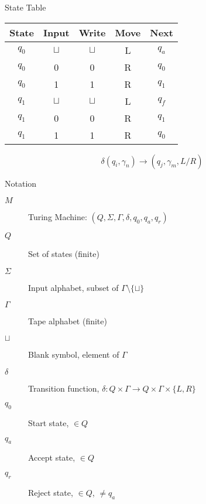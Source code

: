 \begin{frame}{State Table}
  \begin{table}
    \centering
    \begin{tabular}{cc|ccc}
    \toprule
        State & Input & Write & Move & Next \\
    \midrule
        $q_0$ & $\sqcup$ & $\sqcup$ & L & $q_a$ \\
        $q_0$ & 0 & 0 & R & $q_0$ \\
        $q_0$ & 1 & 1 & R & $q_1$ \\
    \midrule
        $q_1$ & $\sqcup$ & $\sqcup$ & L & $q_f$ \\
        $q_1$ & 0 & 0 & R & $q_1$ \\
        $q_1$ & 1 & 1 & R & $q_0$ \\
    \bottomrule
    \end{tabular}
  \end{table}
  

  \[ \delta(q_i, \gamma_n) \rightarrow (q_j, \gamma_m, L/R) \]
\end{frame}



\begin{frame}{Notation}


\begin{description}
  \item[$M$] Turing Machine: $(Q, \Sigma, \Gamma, \delta , q_0, q_a, q_r )$
  \vspace{4mm}
  \item[$Q$] Set of states (finite)
  \item[$\Sigma$] Input alphabet, subset of $\Gamma \setminus \{ \sqcup \} $
  \item[$\Gamma$] Tape alphabet (finite)
  \item[$\sqcup$] Blank symbol, element of $\Gamma$
  \item[$\delta$] Transition function, $\delta: Q \times \Gamma \rightarrow Q \times \Gamma \times \{L,R\}$
  \item[$q_0$] Start state, $\in Q$
  \item[$q_a$] Accept state, $\in Q$
  \item[$q_r$] Reject state, $\in Q$, $\neq q_a$
\end{description}
\end{frame}


